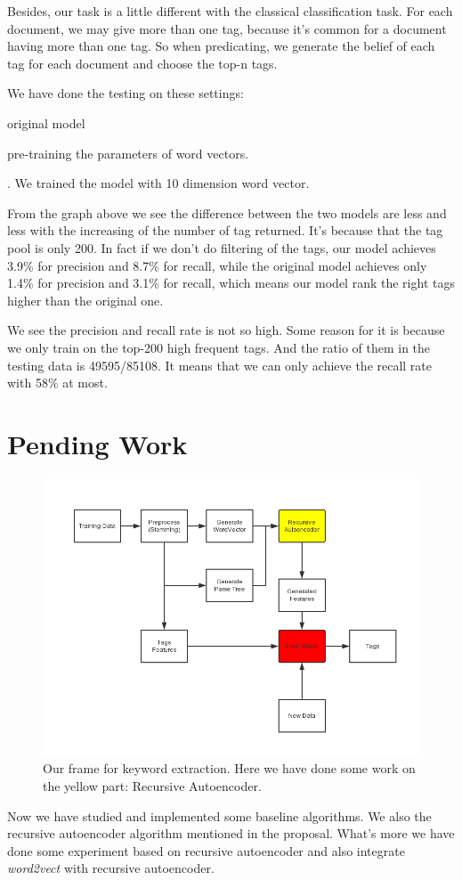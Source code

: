 \documentclass[dvips,12pt]{article}
\begin{document}
        Besides, our task is a little different with the classical classification task. For each document, we may give more than one tag, because it's common for a document having more than one tag. So when predicating, we generate the belief of each tag for each document and choose the top-n tags.
        
        We have done the testing on these settings:\begin{inparaenum}[(i)]
            \item original model
            \item pre-training the parameters of word vectors.
        \end{inparaenum}. We trained the model with 10 dimension word vector.
        
        From the graph above we see the difference between the two models are less and less with the increasing of the number of tag returned. It's because that the tag pool is only 200. In fact if we don't do filtering of the tags, our model achieves 3.9\% for precision and 8.7\% for recall, while the original model achieves only 1.4\% for precision and 3.1\% for recall, which means our model rank the right tags higher than the original one.
        
        We see the precision and recall rate is not so high. Some reason for it is because we only train on the top-200 high frequent tags. And the ratio of them in the testing data is 49595/85108. It means that we can only achieve the recall rate with 58\% at most.
	\section{Pending Work}
    \begin{figure}
        \includegraphics[scale=0.6]{DataFlow.png}
        \caption{Our frame for keyword extraction. Here we have done some work on the yellow part: Recursive Autoencoder.}
        \label{frame}
    \end{figure}
    Now we have studied and implemented some baseline algorithms. We also the recursive autoencoder algorithm mentioned in the proposal. What's more we have done some experiment based on recursive autoencoder and also integrate \emph{word2vect} with recursive autoencoder.
    
\end{document}
